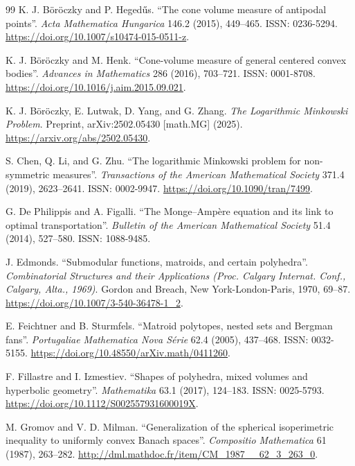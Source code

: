 \documentclass[11pt, a4paper, twoside, reqno]{amsart}
\theoremstyle{definition}
\theoremstyle{remark}
\numberwithin{equation}{section}
\begin{document}
\begin{thebibliography}{99}
K. J. B\"or\"oczky and P. Heged\H{u}s. ``The cone volume measure of antipodal points''. \emph{Acta Mathematica Hungarica} 146.2 (2015), 449--465. ISSN: 0236-5294. \url{https://doi.org/10.1007/s10474-015-0511-z}.

K. J. B\"or\"oczky and M. Henk. ``Cone-volume measure of general centered convex bodies''. \emph{Advances in Mathematics} 286 (2016), 703--721. ISSN: 0001-8708. \url{https://doi.org/10.1016/j.aim.2015.09.021}.

K. J. B\"or\"oczky, E. Lutwak, D. Yang, and G. Zhang. \emph{The Logarithmic Minkowski Problem}. Preprint, arXiv:2502.05430 [math.MG] (2025). \url{https://arxiv.org/abs/2502.05430}.

S. Chen, Q. Li, and G. Zhu. ``The logarithmic Minkowski problem for non-symmetric measures''. \emph{Transactions of the American Mathematical Society} 371.4 (2019), 2623--2641. ISSN: 0002-9947. \url{https://doi.org/10.1090/tran/7499}.

G. De Philippis and A. Figalli. ``The Monge--Amp\`ere equation and its link to optimal transportation''. \emph{Bulletin of the American Mathematical Society} 51.4 (2014), 527--580. ISSN: 1088-9485.

J. Edmonds. ``Submodular functions, matroids, and certain polyhedra''. \emph{Combinatorial Structures and their Applications (Proc. Calgary Internat. Conf., Calgary, Alta., 1969)}. Gordon and Breach, New York-London-Paris, 1970, 69--87. \url{https://doi.org/10.1007/3-540-36478-1_2}.

E. Feichtner and B. Sturmfels. ``Matroid polytopes, nested sets and Bergman fans''. \emph{Portugaliae Mathematica Nova S\'erie} 62.4 (2005), 437--468. ISSN: 0032-5155. \url{https://doi.org/10.48550/arXiv.math/0411260}.

F. Fillastre and I. Izmestiev. ``Shapes of polyhedra, mixed volumes and hyperbolic geometry''. \emph{Mathematika} 63.1 (2017), 124--183. ISSN: 0025-5793. \url{https://doi.org/10.1112/S002557931600019X}.

M. Gromov and V. D. Milman. ``Generalization of the spherical isoperimetric inequality to uniformly convex Banach spaces''. \emph{Compositio Mathematica} 61 (1987), 263--282. \url{http://dml.mathdoc.fr/item/CM_1987__62_3_263_0}.


\end{thebibliography}
\end{document}
